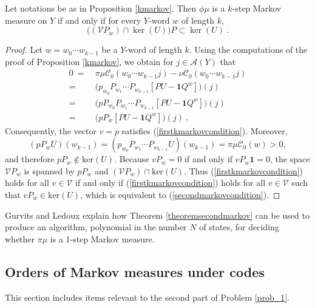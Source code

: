 \documentclass{kepart2010}
\theoremstyle{plain}
\theoremstyle{definition}
\theoremstyle{remark}
\theoremstyle{definition}
\numberwithin{equation}{section}
\begin{document}
 {
\begin{thm} \cite{GurvitsLedoux2005} \label{theoremsecondmarkov}
Let notations be as in Proposition
\ref{kmarkov}. Then $\phi \mu $ is a $k$-step Markov measure on $Y$
if and only if for every $Y$-word $w$ of length $k$, \begin{equation}
\label{secondmarkovcondition} \Big((\mathcal VP_w)\cap \ker(U)\Big)P
\subset \ker(U) \ . \end{equation}
\end{thm}
}
{
\begin{proof}
Let $w=w_0\cdots w_{k-1}$ be a $Y$-word of length $k$. Using the
computations of the proof of Proposition \ref{kmarkov}, we obtain for
$j\in \mathcal A(Y)$ that
\begin{align*}
0 \ =&\
\pi \mu \mathcal C_0(w_0\cdots w_{k-1}j)  -
\nu \mathcal C_0(w_0\cdots w_{k-1}j)  \\
=&\
\Big( p_{w_0}P_{w_1}\cdots P_{w_{k-1}} [PU-\mathbf 1Q^w] \Big) (j) \\
 =&\
\Big( pP_{w_0}P_{w_1}\cdots P_{w_{k-1}} [PU-\mathbf1Q^w] \Big) (j) \\
=&\ \Big( pP_w[PU-\mathbf 1Q^w] \Big) (j) \ .
\end{align*}
Consequently, the vector $v=p$ satisfies
(\ref{firstkmarkovcondition}). Moreover,
\[
(pP_wU)(w_{k-1}) =(p_{w_0}P_{w_1}\cdots P_{w_{k-1}}U)(w_{k-1}) =
\pi\mu\mathcal C_0(w)>0 ,
\]
and therefore $pP_w\notin \text{ker}(U)$.
Because $vP_w=0$ if and only if $vP_w\mathbf 1=0$, the space
$\mathcal VP_w$ is spanned by $pP_w$ and $(\mathcal VP_w)\cap
\text{ker}(U)$. Thus (\ref{firstkmarkovcondition}) holds for all
$v\in \mathcal V$ if and only if
(\ref{firstkmarkovcondition}) holds for all $v\in \mathcal V$ such
that
$vP_w\in \text{ker}(U)$, which is equivalent to
(\ref{secondmarkovcondition}).
\end{proof}
}

{ Gurvits and Ledoux \cite[Sec. 2.2.2]{GurvitsLedoux2005} explain
how Theorem \ref{theoremsecondmarkov} can be used to produce an
algorithm, polynomial in the number $N$ of states,
 for deciding
whether  $\pi \mu$ is a 1-step Markov measure.
 }

\subsection{Orders of Markov measures under codes}\label{sec_orders}

This section includes items relevant to
the second part of Problem \ref{prob_1}.
\end{document}
